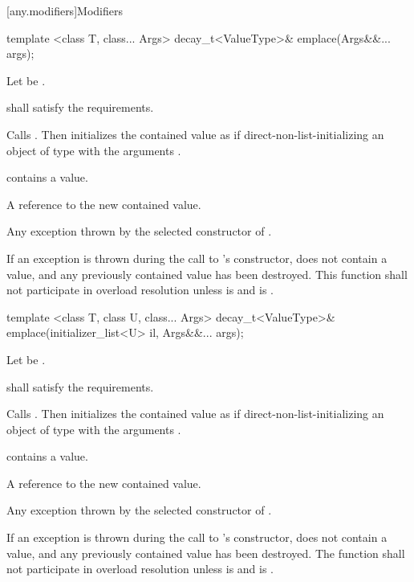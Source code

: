 [any.modifiers]{Modifiers}

%
\begin{itemdecl}
template <class T, class... Args>
  decay_t<ValueType>& emplace(Args&&... args);
\end{itemdecl}

\begin{itemdescr}
\pnum
Let  be .

\pnum
\requires
{} shall satisfy the  requirements.

\pnum
\effects Calls .
Then initializes the contained value as if direct-non-list-initializing
an object of type  with the arguments .

\pnum
\postconditions {} contains a value.

\pnum
\returns
A reference to the new contained value.

\pnum
\throws Any exception thrown by the selected constructor of .

\pnum
\remarks If an exception is thrown during the call to 's constructor,
 does not contain a value, and any previously contained value
has been destroyed.
This function shall not participate in overload resolution unless
 is  and
 is .
\end{itemdescr}

%
\begin{itemdecl}
template <class T, class U, class... Args>
  decay_t<ValueType>& emplace(initializer_list<U> il, Args&&... args);
\end{itemdecl}

\begin{itemdescr}
\pnum
Let  be .

\pnum
\requires
{} shall satisfy the  requirements.

\pnum
\effects Calls . Then initializes the contained value
as if direct-non-list-initializing an object of type  with the arguments
.

\pnum
\postconditions {} contains a value.

\pnum
\returns
A reference to the new contained value.

\pnum
\throws Any exception thrown by the selected constructor of .

\pnum
\remarks If an exception is thrown during the call to 's constructor,
 does not contain a value, and any previously contained value
has been destroyed.
The function shall not participate in overload resolution unless
 is  and
 is .
\end{itemdescr}

